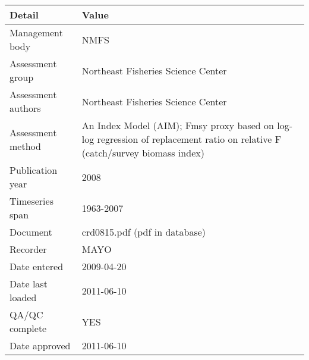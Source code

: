 \begin{table}[htb]
\centering
\begin{tabular}{lp{7cm}}
\toprule
Detail & Value \\
\midrule
Management body    & NMFS                                                                                                                         \\
Assessment group   & Northeast Fisheries Science Center                                                                                           \\
Assessment authors & Northeast Fisheries Science Center                                                                                           \\
Assessment method  & An Index Model (AIM); Fmsy proxy based on log-log regression of replacement ratio on relative F (catch/survey biomass index) \\
Publication year   & 2008                                                                                                                         \\
Timeseries span    & 1963-2007                                                                                                                    \\
Document           & crd0815.pdf (pdf in database)                                                                                                \\
Recorder           & MAYO                                                                                                                         \\
Date entered       & 2009-04-20                                                                                                                   \\
Date last loaded   & 2011-06-10                                                                                                                   \\
QA/QC complete     & YES                                                                                                                          \\
Date approved      & 2011-06-10                                                                                                                   \\
\bottomrule
\end{tabular}
\label{tab:assessdet}
\end{table}
